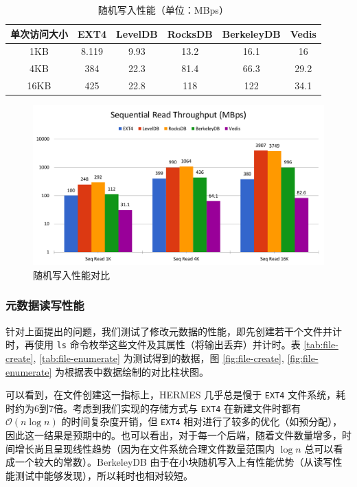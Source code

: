 \documentclass{ctexart}
\begin{document}
\begin{table}[htbp]
\centering
\caption{随机写入性能（单位：MBps）}
\label{tab:rand-write}
\begin{tabular}{cccccc}
\hline
单次访问大小 & EXT4  & LevelDB & RocksDB & BerkeleyDB & Vedis \\ \hline
1KB     & 8.119 & 9.93    & 13.2    & 16.1       & 16    \\
4KB     & 384   & 22.3    & 81.4    & 66.3       & 29.2  \\
16KB    & 425   & 22.8    & 118     & 122        & 34.1  \\ \hline
\end{tabular}
\end{table}

\begin{figure}[htbp]
\centering
\caption{随机写入性能对比}
\label{fig:rand-write}
\includegraphics[page=4,width=\textwidth]{HERMES_perf_plot.pdf}
\end{figure}

\subsubsection{元数据读写性能}

针对上面提出的问题，我们测试了修改元数据的性能，即先创建若干个文件并计时，再使用 \texttt{ls} 命令枚举这些文件及其属性（将输出丢弃）并计时。表 \ref{tab:file-create}, \ref{tab:file-enumerate} 为测试得到的数据，图 \ref{fig:file-create}, \ref{fig:file-enumerate} 为根据表中数据绘制的对比柱状图。

可以看到，在文件创建这一指标上，HERMES 几乎总是慢于 \texttt{EXT4} 文件系统，耗时约为6到7倍。考虑到我们实现的存储方式与 \texttt{EXT4} 在新建文件时都有 $\mathcal{O}(n \log n)$ 的时间复杂度开销，但 \texttt{EXT4} 相对进行了较多的优化（如预分配），因此这一结果是预期中的。也可以看出，对于每一个后端，随着文件数量增多，时间增长尚且呈现线性趋势（因为在文件系统合理文件数量范围内 $\log n$ 总可以看成一个较大的常数）。BerkeleyDB 由于在小块随机写入上有性能优势（从读写性能测试中能够发现），所以耗时也相对较短。
\end{document}
